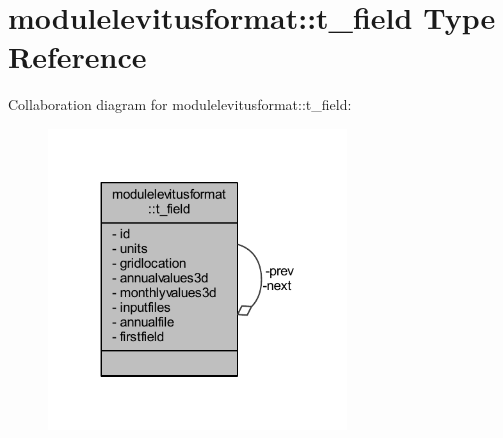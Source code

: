 \hypertarget{structmodulelevitusformat_1_1t__field}{}\section{modulelevitusformat\+:\+:t\+\_\+field Type Reference}
\label{structmodulelevitusformat_1_1t__field}


Collaboration diagram for modulelevitusformat\+:\+:t\+\_\+field\+:\nopagebreak
\begin{figure}[H]
\begin{center}
\leavevmode
\includegraphics[width=224pt]{structmodulelevitusformat_1_1t__field__coll__graph}
\end{center}
\end{figure}
